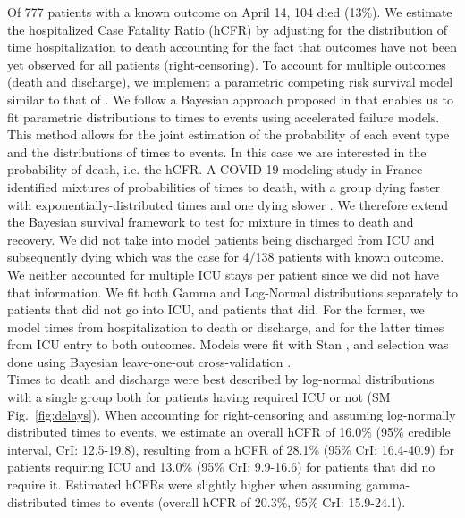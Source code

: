 Of 777 patients with a known outcome on April 14, 104 died (13\%). 
We estimate the hospitalized Case Fatality Ratio (hCFR) by adjusting for the distribution of time hospitalization to death accounting for the fact that outcomes have not been yet observed for all patients (right-censoring). To account for multiple outcomes (death and discharge), we implement a parametric competing risk survival model similar to that of \cite{Ghani:MethodsEstimatingCase:2005}. We follow a Bayesian approach proposed in \cite{Bellot:TreebasedBayesianMixture:2018} that enables us to fit parametric distributions to times to events using accelerated failure models. This method allows for the joint estimation of the probability of each event type and the distributions of times to events. In this case we are interested in the probability of death, i.e. the hCFR. A COVID-19 modeling study in France identified mixtures of probabilities of times to death, with a group dying faster with exponentially-distributed times and one dying slower \cite{Salje:EstimatingBurdenSARSCoV2:2020}. We therefore extend the Bayesian survival framework to test for mixture in times to death and recovery. We did not take into model patients being discharged from ICU and subsequently dying which was the case for 4/138 patients with known outcome. We neither accounted for multiple ICU stays per patient since we did not have that information. We fit both Gamma and Log-Normal distributions separately to patients that did not go into ICU, and patients that did. For the former, we model times from hospitalization to death or discharge, and for the latter times from ICU entry to both outcomes. Models were fit with Stan \cite{Carpenter:StanProbabilisticProgramming:2017}, and selection was done using Bayesian leave-one-out cross-validation \cite{Vehtari:PracticalBayesianModel:2017}. \\

Times to death and discharge were best described by log-normal distributions with a single group both for patients having required ICU or not (SM Fig.~\ref{fig:delays}). When accounting for right-censoring and assuming log-normally distributed times to events, we estimate an overall hCFR of 16.0\% (95\% credible interval, CrI: 12.5-19.8), resulting from a hCFR of 28.1\% (95\% CrI: 16.4-40.9) for patients requiring ICU and 13.0\% (95\% CrI: 9.9-16.6) for patients that did no require it. Estimated hCFRs were slightly higher when assuming gamma-distributed times to events (overall hCFR of 20.3\%, 95\% CrI: 15.9-24.1).

